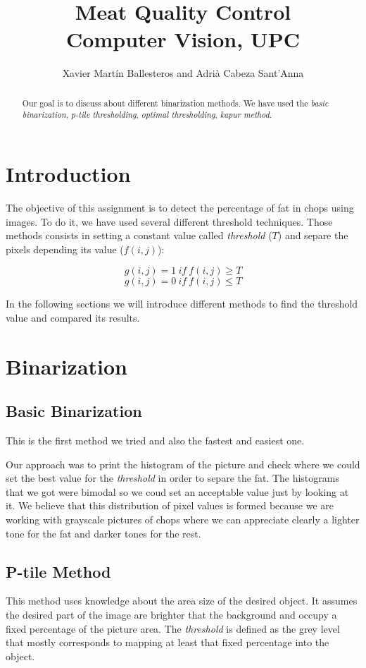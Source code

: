 \documentclass[12]{article}
\author{Xavier Martín Ballesteros and Adrià Cabeza Sant'Anna}
\title{Meat Quality Control \\ \large{Computer Vision, UPC}}
\begin{document}
\maketitle
  \vspace{1cm}
	\begin{abstract}
Our goal is to discuss about different binarization methods. We have used the \textit{basic binarization}, \textit{p-tile thresholding}, \textit{optimal thresholding}, \textit{kapur method}.
\end{abstract}

\newpage
\tableofcontents
\section{Introduction}
The objective of this assignment is to detect the percentage of fat in chops using images. To do it, we have used several different threshold techniques. Those methods consists in setting a constant value called \textit{threshold} ($T$) and separe the pixels depending its value ($ f(i,j)$):
\vspace{-0.6cm}
\begin{center}
$$ g(i,j)=1\ if\ f(i,j) \geq T$$ 
$$ g(i,j)=0\ if\ f(i,j) \leq T$$
\end{center}

In the following sections we will introduce different methods to find the threshold value and compared its results. 

\section{Binarization}
\subsection{Basic Binarization}
This is the first method we tried and also the fastest and easiest one. 

\noindent Our approach was to print the histogram of the picture and check where we could set the best value for the \textit{threshold} in order to separe the fat. The histograms that we got were bimodal so we coud set an acceptable value just by looking at it. We believe that this distribution of pixel values is formed because we are working with grayscale pictures of chops where we can appreciate clearly a lighter tone for the fat and darker tones for the rest.
\subsection{P-tile Method}
This method uses knowledge about the area size of the desired object. It assumes the desired part of the image are brighter that the background and occupy a fixed percentage of the picture area. The \textit{threshold} is defined as the grey level that mostly corresponds to mapping at least that fixed percentage into the object. 
\end{document}
